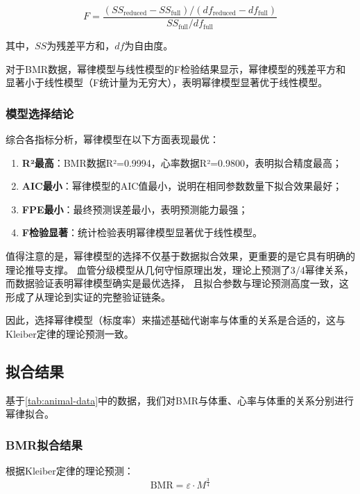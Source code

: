 \begin{equation}
F = \frac{(SS_{\text{reduced}} - SS_{\text{full}}) / (df_{\text{reduced}} - df_{\text{full}})}{SS_{\text{full}} / df_{\text{full}}}
\end{equation}

其中，$SS$为残差平方和，$df$为自由度。

对于BMR数据，幂律模型与线性模型的F检验结果显示，幂律模型的残差平方和显著小于线性模型（F统计量为无穷大），表明幂律模型显著优于线性模型。

\subsubsection{模型选择结论}

综合各指标分析，幂律模型在以下方面表现最优：

\begin{enumerate}
    \item \textbf{R²最高}：BMR数据R²=0.9994，心率数据R²=0.9800，表明拟合精度最高；
    \item \textbf{AIC最小}：幂律模型的AIC值最小，说明在相同参数数量下拟合效果最好；
    \item \textbf{FPE最小}：最终预测误差最小，表明预测能力最强；
    \item \textbf{F检验显著}：统计检验表明幂律模型显著优于线性模型。
\end{enumerate}

值得注意的是，幂律模型的选择不仅基于数据拟合效果，更重要的是它具有明确的理论推导支撑。
血管分级模型从几何守恒原理出发，理论上预测了3/4幂律关系，而数据验证表明幂律模型确实是最优选择，
且拟合参数与理论预测高度一致，这形成了从理论到实证的完整验证链条。

因此，选择幂律模型（标度率）来描述基础代谢率与体重的关系是合适的，这与Kleiber定律的理论预测一致。

\subsection{拟合结果}

基于\cref{tab:animal-data}中的数据，我们对BMR与体重、心率与体重的关系分别进行幂律拟合。

\subsubsection{BMR拟合结果}

根据Kleiber定律的理论预测：
\begin{equation}
\text{BMR} = \varepsilon \cdot M^{\frac{3}{4}}
\label{eq:bmr-theoretical}
\end{equation}

